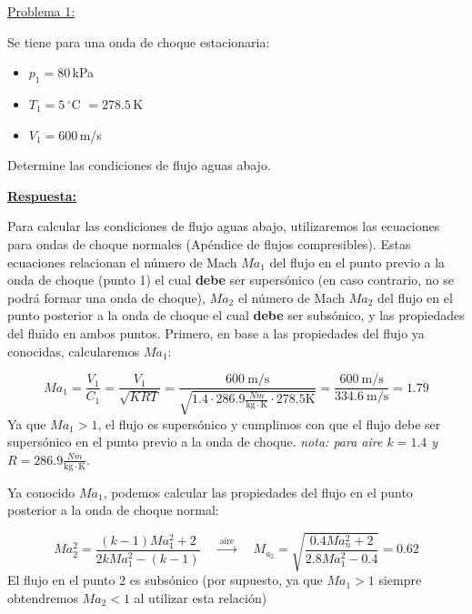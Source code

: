 \documentclass[11pt]{report}
\begin{document}

\vspace{1cm}


\vspace{1cm}

\underline {Problema 1:}
\vspace{0.2cm}

Se tiene para una onda de choque estacionaria:
\begin{itemize}
\item $p_1=80$\,kPa
\item $T_1=5$\,$^\circ$C $= 278.5$\,K
\item $V_1=600$\,m/s
\end{itemize}
Determine las condiciones de flujo aguas abajo.
\vspace{0.2cm}

\underline{\textbf{Respuesta:}}

Para calcular las condiciones de flujo aguas abajo, utilizaremos las ecuaciones para ondas de choque normales (Ap\'endice de flujos compresibles). Estas ecuaciones relacionan el n\'umero de Mach $Ma_1$ del flujo en el punto previo a la onda de choque (punto 1) el cual \textbf{debe} ser supers\'onico (en caso contrario, no se podr\'a formar una onda de choque), $Ma_2$ el n\'umero de Mach $Ma_2$ del flujo en el punto posterior a la onda de choque el cual \textbf{debe} ser subs\'onico, y las propiedades del fluido en ambos puntos. Primero, en base a las propiedades del flujo ya conocidas, calcularemos $Ma_1$:


$$
M a_{1}=\frac{V_{1}}{C_{1}}=\frac{V_{1}}{\sqrt{K R T}}=\frac{600 \mathrm{~m/s}}{\sqrt{1.4 \cdot 286.9 \frac{N m}{\mathrm{kg\cdot K}} \cdot 278.5 \mathrm{K}}}=\frac{600 \mathrm{~m}/ \mathrm{s}}{334.6 \mathrm{~m} / \mathrm{s}}=1.79
$$
Ya que $Ma_1>1$, el flujo es supers\'onico y cumplimos con que el flujo debe ser supers\'onico en el punto previo a la onda de choque. \textit{nota: para aire $k=1.4$ y $R=286.9\frac{N m}{\mathrm{kg\cdot K}}$}.

Ya conocido $Ma_1$, podemos calcular las propiedades del flujo en el punto posterior a la onda de choque normal:


$$
M a_{2}^{2}=\frac{(k-1) M a_{1}^{2}+2}{2 k Ma_{1}^{2}-(k-1)} \quad \stackrel{\text { aire }}{\longrightarrow} \quad M_{a_{2}}=\sqrt{\frac{0.4 Ma_{n}^{2}+2}{2.8 M a_{1}^{2}-0.4}}=0.62
$$
El flujo en el punto $2$ es subs\'onico (por supuesto, ya que $Ma_1>1$ siempre obtendremos $Ma_2<1$ al utilizar esta relaci\'on)
\end{document}
